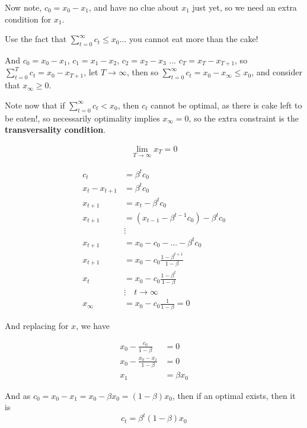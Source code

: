 \documentclass[aspectratio=169]{beamer}
\begin{document}
\begin{frame}
    Now note, $c_0 = x_0 - x_1$, and have no clue about $x_1$ just yet, so we need an extra condition for $x_1$.
    
    \vspace{0.5cm}
    
    Use the fact that $\sum_{t=0}^\infty c_t \leq x_0$... you cannot eat more than the cake!
    
    And $c_0 = x_0-x_1$, $c_1=x_1-x_2$, $c_2 = x_2 - x_3$ ... $c_T = x_T - x_{T+1}$, so $\sum_{t=0}^T c_t = x_0 - x_{T+1}$, let $T\rightarrow\infty$, then so $\sum_{t=0}^\infty c_t=x_0 - x_{\infty} \leq x_0$, and consider that $x_{\infty}\geq 0$.
    
    \vspace{0.5cm}
    
    Note now that if $\sum_{t=0}^\infty c_t < x_0$, then $c_t$ cannot be optimal, as there is cake left to be eaten!, so necessarily optimality implies $x_\infty = 0$, so the extra constraint is the \textbf{transversality condition}.
    
    \begin{align*}
        \lim_{T\rightarrow \infty} x_T = 0
    \end{align*}
    
\end{frame}

\begin{frame}

    \begin{align*}
        c_t &= \beta^t c_0\\
        x_t - x_{t+1} &= \beta^t c_0\\
        x_{t+1} &= x_t - \beta^t c_0\\
        x_{t+1} &= (x_{t-1}-\beta^{t-1}c_0) - \beta^t c_0\\
        &\vdots\\
        x_{t+1}&= x_0 - c_0 - ... - \beta^t c_0\\
        x_{t+1}&= x_0 - c_0 \frac{1-\beta^{t+1}}{1-\beta}\\
        x_{t}&= x_0 - c_0 \frac{1-\beta^{t}}{1-\beta}\\
        &\vdots \quad t\rightarrow \infty \\
        x_\infty &= x_0 - c_0 \frac{1}{1-\beta} = 0
    \end{align*}

\end{frame}

\begin{frame}
    
    And replacing for $x$, we have
    
    \begin{align*}
        x_0 - \frac{c_0}{1-\beta} &= 0\\
        x_0 - \frac{x_0-x_1}{1-\beta} & = 0\\
        x_1 & = \beta x_0
    \end{align*}
    
    And as $c_0 = x_0-x_1 = x_0 - \beta x_0 = (1-\beta)x_0$, then if an optimal exists, then it is $$c_t = \beta^t(1-\beta)x_0$$
    
\end{frame}
\end{document}
